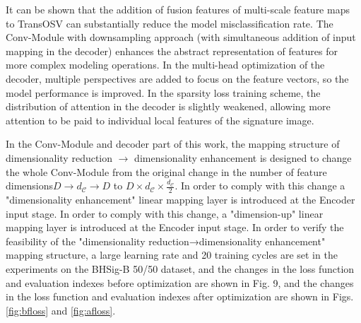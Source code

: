 It can be shown that the addition of fusion features of multi-scale feature maps to TransOSV can substantially reduce the model misclassification rate. The Conv-Module with downsampling approach (with simultaneous addition of input mapping in the decoder) enhances the abstract representation of features for more complex modeling operations. In the multi-head optimization of the decoder, multiple perspectives are added to focus on the feature vectors, so the model performance is improved. In the sparsity loss training scheme, the distribution of attention in the decoder is slightly weakened, allowing more attention to be paid to individual local features of the signature image.

In the Conv-Module and decoder part of this work, the mapping structure of dimensionality reduction $\to$ dimensionality enhancement is designed to change the whole Conv-Module from the original change in the number of feature dimensions$ D \to d_\mathcal{C} \to D$ to $D \times d_\mathcal{C} \times \frac{d_\mathcal{C}}{2}$. In order to comply with this change a "dimensionality enhancement" linear mapping layer is introduced at the Encoder input stage. In order to comply with this change, a "dimension-up" linear mapping layer is introduced at the Encoder input stage. In order to verify the feasibility of the "dimensionality reduction→dimensionality enhancement" mapping structure, a large learning rate and 20 training cycles are set in the experiments on the BHSig-B 50/50 dataset, and the changes in the loss function and evaluation indexes before optimization are shown in Fig. 9, and the changes in the loss function and evaluation indexes after optimization are shown in Figs. \ref{fig:bfloss} and \ref{fig:afloss}.


